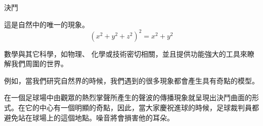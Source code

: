 \begin{surferPage}{決鬥}

這是自然中的唯一的現象。\\
\smallskip
\[(x^2+ y^2+ z^2)^2	= x^2+ y^2\]

\singlespacing

數學與其它科學，如物理、 化學或技術密切相關，並且提供功能強大的工具來瞭解我們周圍的世界。

\singlespacing

例如，當我們研究自然界的時候，我們遇到的很多現象都會產生具有奇點的模型。

\singlespacing

在一個足球場中由觀眾的熱烈掌聲所產生的聲波的傳播現象就呈現出決鬥曲面的形式。在它的中心有一個明顯的奇點，因此，當大家慶祝進球的時候，足球裁判員都避免站在球場上的這個地點。噪音將會損害他的耳朵。

\end{surferPage}

